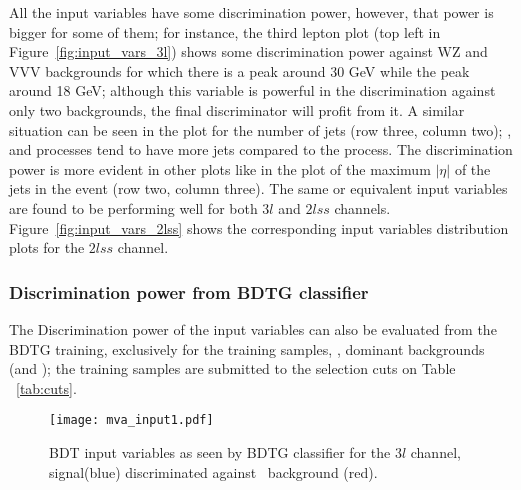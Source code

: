 All the input variables have some discrimination power, however, that power is bigger for some of them; for instance, the third lepton \pt plot (top left in Figure~\ref{fig:input_vars_3l}) shows some discrimination power against WZ and VVV backgrounds for which there is a peak around 30 GeV while the \tHq peak around 18 GeV; although this variable is powerful in the discrimination against only two backgrounds, the final discriminator will profit from it. A similar situation can be seen in the plot for the number of jets (row three, column two); \ttW, \ttZ and \ttH processes tend to have more jets compared to the \tHq process. The discrimination power is more evident in other plots like in the plot of the maximum $|\eta|$ of the jets in the event (row two, column three). The same or equivalent input variables are found to be performing well for both $3l$ and $2lss$ channels. Figure~\ref{fig:input_vars_2lss} shows the corresponding input variables distribution plots for the $2lss$ channel.

\subsubsection*{Discrimination power from BDTG classifier}


The Discrimination power of the input variables can also be evaluated from the BDTG training, exclusively for the training samples, \ie, dominant backgrounds (\ttbar and \ttV); the training samples are submitted to the selection cuts on Table ~\ref{tab:cuts}.

\begin{figure} [!ht]
  \centering
  \texttt{[image: mva\_input1.pdf]}
  \caption[BDT input variables. Discrimination against \ttbar and \ttV\ in $3l$ channel.]{BDT input variables as seen by BDTG classifier for the $3l$ channel, \tHq signal(blue) discriminated against \ttV\ background (red).}
\label{fig:mva_input_comp}
\end{figure}

